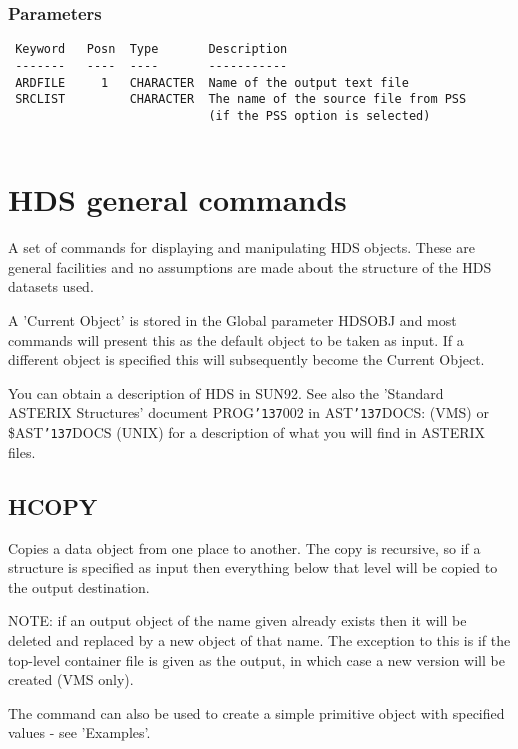 \documentclass{book}
\renewcommand{\_}{{\tt\char'137}}     %
\begin{document}
\subsection{Parameters}
\begin{verbatim}
 Keyword   Posn  Type       Description
 -------   ----  ----       -----------
 ARDFILE     1   CHARACTER  Name of the output text file
 SRCLIST         CHARACTER  The name of the source file from PSS
                            (if the PSS option is selected)
 
\end{verbatim}\chapter{HDS general commands}
A set of commands for displaying and manipulating HDS objects.
These are general facilities and no assumptions are made about
the structure of the HDS datasets used.
 
A 'Current Object' is stored in the Global parameter HDSOBJ and
most commands will present this as the default object to be taken
as input. If a different object is specified this will
subsequently become the Current Object.
 
You can obtain a description of HDS in SUN92. See also
the 'Standard ASTERIX Structures' document PROG\_002 in
AST\_DOCS: (VMS) or \$AST\_DOCS (UNIX) for a description of
what you will find in ASTERIX files.
 
\section{HCOPY}
Copies a data object from one place to another. The copy is
recursive, so if a structure is specified as input then
everything below that level will be copied to the output
destination.
 
NOTE: if an output object of the name given already exists then
it will be deleted and replaced by a new object of that name. The
exception to this is if the top-level container file is given as
the output, in which case a new version will be created (VMS only).
 
The command can also be used to create a simple primitive object
with specified values - see 'Examples'.
 
\end{document}
